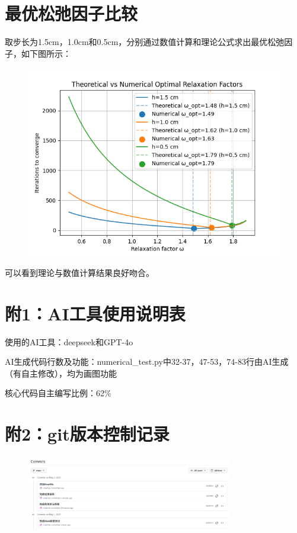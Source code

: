 \documentclass[12pt, a4paper]{article}
\begin{document}
\section{最优松弛因子比较}
取步长为1.5cm，1.0cm和0.5cm，分别通过数值计算和理论公式求出最优松弛因子，如下图所示：
\begin{figure}
    \centering
    \includegraphics[width=\textwidth]{pictures/Theoretical vs Numerical Optimal Relaxation Factors.png}
\end{figure}
可以看到理论与数值计算结果良好吻合。

\section*{附1：AI工具使用说明表}
使用的AI工具：deepseek和GPT-4o

AI生成代码行数及功能：numerical\_test.py中32-37，47-53，74-83行由AI生成（有自主修改），均为画图功能

核心代码自主编写比例：62\%

\section*{附2：git版本控制记录}
\begin{figure}[htbp]
    \centering
    \includegraphics[width=0.8\textwidth]{./pictures/git_control.png}
\end{figure}
\end{document}
